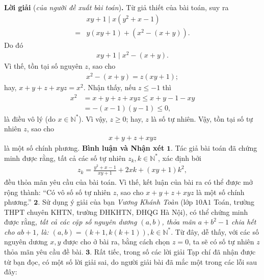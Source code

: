 \begin{multicols}{2}
	\vskip 0.05cm
	\textbf{\color{thachthuctoanhoc}Lời giải} (\textit{của người đề xuất bài toán})\textbf{\color{thachthuctoanhoc}.}
	\vskip 0.05cm
	Từ giả thiết của bài toán, suy ra
	\begin{align*}
		&{xy + 1} \mid x\left( {{y^2} + x - 1} \right) \\
		= &y\left( {xy + 1} \right) + \left( {{x^2} - \left( {x + y} \right)} \right).
	\end{align*}
	Do đó
	\begin{align*}
		{xy + 1} \mid {x^2} - \left( {x + y} \right).
	\end{align*}
	Vì thế, tồn tại số nguyên $z$, sao cho
	\begin{align*}
		{x^2} - \left( {x + y} \right) = z\left( {xy + 1} \right);
	\end{align*}
	hay, $x + y + z + xyz = {x^2}.$
	\vskip 0.05cm  
	Nhận thấy, nếu $z \le -1$  thì
	\begin{align*}
		{x^2} &= x + y + z + xyz \le x + y - 1 - xy \\
		&= - \left( {x - 1} \right)\left( {y - 1} \right) \le 0,
	\end{align*}
	là điều vô lý (do  $x \in \mathbb{N^*}$).
	\vskip 0.05cm
	Vì vậy, $z \ge 0$; hay, $z$ là số tự nhiên.
	\vskip 0.05cm
	Vậy, tồn tại số tự nhiên $z$, sao cho 
	\begin{align*}
		x + y + z + xyz
	\end{align*} là một số chính phương.
	\vskip 0.05cm
	\textbf{\color{thachthuctoanhoc}Bình luận và Nhận xét}
	\vskip 0.05cm
	$\pmb{1.}$ Tác giả bài toán đã chứng minh được rằng, tất cả các số tự nhiên $z_k, k \in \mathbb{N^*}$, xác định bởi
	\begin{align*}
		{z_k} = \frac{{{y^2} + x - 1}}{{xy + 1}} +2xk + \left( {xy + 1} \right){k^2},
	\end{align*}
	đều thỏa mãn yêu cầu của bài toán. Vì thế, kết luận của bài ra có thể được mở rộng thành: “Có vô số số tự nhiên $z$, sao cho $x + y + z + xyz$ là một số chính phương.”
	\vskip 0.05cm
	$\pmb{2.}$ Sử dụng ý giải của bạn \textit{Vương Khánh Toàn} (lớp $10$A$1$ Toán, trường THPT chuyên KHTN, trường ĐHKHTN, ĐHQG Hà Nội), có thể chứng minh được rằng, \textit{tất cả các cặp số nguyên dương $(a, b)$, thỏa mãn $a+b^2 -1$ chia hết cho $ab + 1$, là: \linebreak$(a, b) = (k + 1, k(k + 1)), k \in \mathbb{N^*}$}. Từ đây, dễ thấy, với các số nguyên dương $x,y$ được cho ở bài ra, bằng cách chọn $z = 0$, ta sẽ có số tự nhiên $z$ thỏa mãn yêu cầu đề bài.
	\vskip 0.05cm
	$\pmb{3.}$ Rất tiếc, trong số các lời giải Tạp chí đã nhận được từ bạn đọc, có một số lời giải sai, do người giải bài đã mắc một trong các lỗi sau đây:

\end{multicols}
